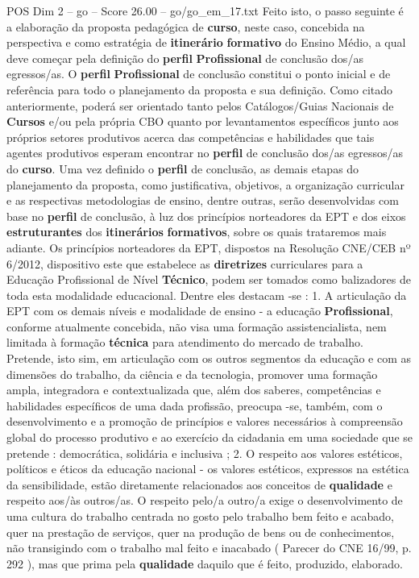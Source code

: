 \begin{textsample}{POS Dim 2 – go – Score 26.00 – go/go\_em\_17.txt}
Feito isto, o passo seguinte é a elaboração da proposta pedagógica de \textbf{curso}, neste caso, concebida na perspectiva e como estratégia de \textbf{itinerário} \textbf{formativo} do Ensino Médio, a qual deve começar pela definição do \textbf{perfil} \textbf{Profissional} de conclusão dos/as egressos/as.
O \textbf{perfil} \textbf{Profissional} de conclusão constitui o ponto inicial e de referência para todo o planejamento da proposta e sua definição.
Como citado anteriormente, poderá ser orientado tanto pelos Catálogos/Guias Nacionais de \textbf{Cursos} e/ou pela própria CBO quanto por levantamentos específicos junto aos próprios setores produtivos acerca das competências e habilidades que tais agentes produtivos esperam encontrar no \textbf{perfil} de conclusão dos/as egressos/as do \textbf{curso}.
Uma vez definido o \textbf{perfil} de conclusão, as demais etapas do planejamento da proposta, como justificativa, objetivos, a organização curricular e as respectivas metodologias de ensino, dentre outras, serão desenvolvidas com base no \textbf{perfil} de conclusão, à luz dos princípios norteadores da EPT e dos eixos \textbf{estruturantes} dos \textbf{itinerários} \textbf{formativos}, sobre os quais trataremos mais adiante.
Os princípios norteadores da EPT, dispostos na Resolução CNE/CEB nº 6/2012, dispositivo este que estabelece as \textbf{diretrizes} curriculares para a Educação Profissional de Nível \textbf{Técnico}, podem ser tomados como balizadores de toda esta modalidade educacional.
Dentre eles destacam -se : 1.
A articulação da EPT com os demais níveis e modalidade de ensino - a educação \textbf{Profissional}, conforme atualmente concebida, não visa uma formação assistencialista, nem limitada à formação \textbf{técnica} para atendimento do mercado de trabalho.
Pretende, isto sim, em articulação com os outros segmentos da educação e com as dimensões do trabalho, da ciência e da tecnologia, promover uma formação ampla, integradora e contextualizada que, além dos saberes, competências e habilidades específicos de uma dada profissão, preocupa -se, também, com o desenvolvimento e a promoção de princípios e valores necessários à compreensão global do processo produtivo e ao exercício da cidadania em uma sociedade que se pretende : democrática, solidária e inclusiva ; 2.
O respeito aos valores estéticos, políticos e éticos da educação nacional - os valores estéticos, expressos na estética da sensibilidade, estão diretamente relacionados aos conceitos de \textbf{qualidade} e respeito aos/às outros/as.
O respeito pelo/a outro/a exige o desenvolvimento de uma cultura do trabalho centrada no gosto pelo trabalho bem feito e acabado, quer na prestação de serviços, quer na produção de bens ou de conhecimentos, não transigindo com o trabalho mal feito e inacabado ( Parecer do CNE 16/99, p. 292 ), mas que prima pela \textbf{qualidade} daquilo que é feito, produzido, elaborado.

\end{textsample}
